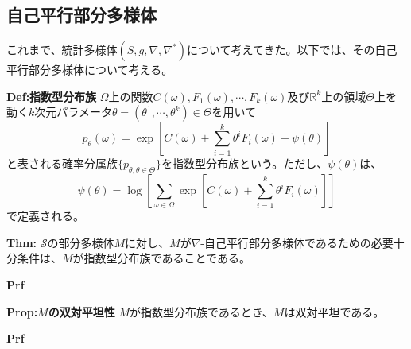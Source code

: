 \documentclass[a4paper,11pt]{jsarticle}
\numberwithin{equation}{section}
\begin{document}
\subsection{自己平行部分多様体}
これまで、統計多様体$(S,g,\nabla,\nabla^*)$について考えてきた。以下では、その自己平行部分多様体について考える。\\
\begin{itembox}[l]{\textbf{Def:指数型分布族}}
    $\Omega$上の関数$C(\omega),F_1(\omega),\cdots,F_k(\omega)$及び$\mathbb{R}^k$上の領域$\Theta$上を動く$k$次元パラメータ$\theta = (\theta^1,\cdots,\theta^k) \in \Theta$を用いて
    \begin{equation}
        p_{\theta}(\omega) = \exp\left[ C(\omega) + \sum_{i=1}^{k} \theta^i F_i(\omega) - \psi(\theta) \right]
    \end{equation}
    と表される確率分属族$\{p_{\theta;\theta \in \Theta}\}$を指数型分布族という。ただし、$\psi(\theta)$は、
    \begin{equation}
        \psi(\theta) = \log \left[ \sum_{\omega \in \Omega} \exp\left[ C(\omega) + \sum_{i=1}^{k} \theta^i F_i(\omega) \right] \right]
    \end{equation}
    で定義される。  

\end{itembox}

\begin{itembox}[l]{\textbf{Thm:}}
    $\mathcal{S}$の部分多様体$M$に対し、$M$が$\nabla$-自己平行部分多様体であるための必要十分条件は、$M$が指数型分布族であることである。
\end{itembox}
\textbf{Prf}\\

\begin{itembox}[l]{\textbf{Prop:$M$の双対平坦性}}
    $M$が指数型分布族であるとき、$M$は双対平坦である。

\end{itembox}
\textbf{Prf}\\
\end{document}
